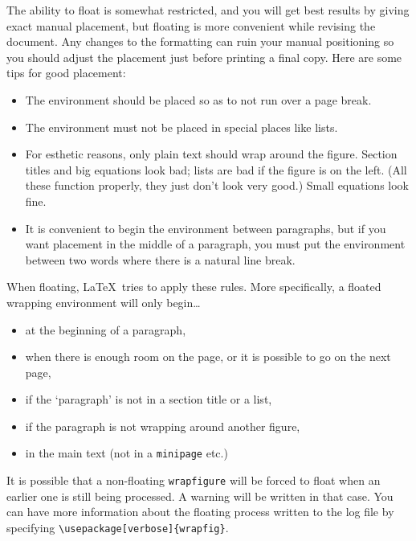 \documentclass[pagesize=auto]{scrartcl}
\newcommand*{\env}[1]{\texttt{#1}}
\begin{document}
The ability to float is somewhat restricted, and you will get best results
by giving exact manual placement, but floating is more convenient while
revising the document.  Any changes to the formatting can ruin your manual
positioning so you should adjust the placement just before printing a
final copy.  Here are some tips for good placement:
%
\begin{itemize}
\item The environment should be placed so as to not run over a page break.

\item The environment must not be placed in special places like lists.

\item For esthetic reasons, only plain text should wrap around the figure.
  Section titles and big equations look bad; lists are bad if the figure 
  is on the left.  (All these function properly, they just don't look 
  very good.)  Small equations look fine.

\item It is convenient to begin the environment between paragraphs, but if
  you want placement in the middle of a paragraph, you must put the
  environment between two words where there is a natural line break.
\end{itemize}

When floating, \LaTeX\ tries to apply these rules.  More specifically,
a floated wrapping environment will only begin\dots
%
\begin{itemize}
\item at the beginning of a paragraph,

\item when there is enough room on the page, or it is possible to go on
  the next page,

\item if the `paragraph' is not in a section title or a list,

\item if the paragraph is not wrapping around another figure,

\item in the main text (not in a \env{minipage} etc.)
\end{itemize}

It is possible that a non-floating \env{wrapfigure} will be forced to float
when an earlier one is still being processed.  A warning will be written
in that case.  You can have more information about the floating process
written to the log file by specifying \verb+\usepackage[verbose]{wrapfig}+.
\end{document}
